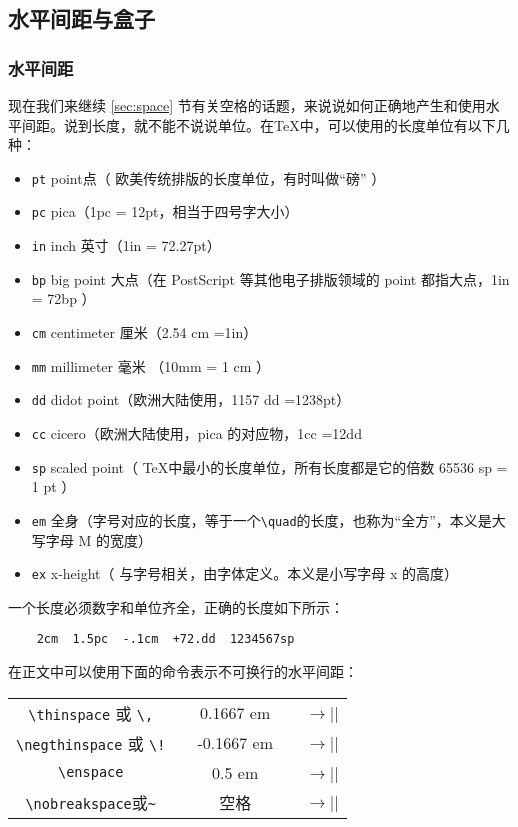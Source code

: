 \subsection{水平间距与盒子} \label{sec:box}

\subsubsection{水平间距}

现在我们来继续 \ref{sec:space} 节有关空格的话题，来说说如何正确地产生和使用水平间距。说到长度，就不能不说说单位。在\TeX 中，可以使用的长度单位有以下几种：
\begin{itemize}
    \item \verb|pt| \qquad point点（ 欧美传统排版的长度单位，有时叫做“磅” ）
    \item \verb|pc| \qquad pica（1pc = 12pt，相当于四号字大小）
    \item \verb|in| \qquad inch 英寸（1in = 72.27pt）
    \item \verb|bp| \qquad big point 大点（在 PostScript 等其他电子排版领域的 point 都指大点，1in = 72bp ）
    \item \verb|cm| \qquad centimeter 厘米（2.54 cm =1in）
    \item \verb|mm| \qquad millimeter 毫米 （10mm = 1 cm ）
    \item \verb|dd| \qquad didot point（欧洲大陆使用，1157 dd =1238pt）
    \item \verb|cc| \qquad cicero（欧洲大陆使用，pica 的对应物，1cc =12dd
    \item \verb|sp| \qquad scaled point（ \TeX 中最小的长度单位，所有长度都是它的倍数 65536 sp = 1 pt ）
    \item \verb|em| \qquad 全身（字号对应的长度，等于一个\verb|\quad|的长度，也称为“全方”，本义是大写字母 M 的宽度）
    \item \verb|ex| \qquad x-height（ 与字号相关，由字体定义。本义是小写字母 x 的高度）
\end{itemize}

一个长度必须数字和单位齐全，正确的长度如下所示：
\begin{lstlisting}
    2cm  1.5pc  -.1cm  +72.dd  1234567sp
\end{lstlisting}

在正文中可以使用下面的命令表示不可换行的水平间距：
\begin{table}[H]
    \centering
    \begin{tabular}{ccccc}
    \verb|\thinspace| 或 \verb|\,| && 0.1667 em && $\longrightarrow$\negthinspace|\thinspace| \\
    \verb|\negthinspace| 或 \verb|\!| && -0.1667 em && $\longrightarrow$\negthinspace|\negthinspace\negthinspace| \\
    \verb|\enspace|  && 0.5 em && $\longrightarrow$\negthinspace|\enspace| \\
    \verb|\nobreakspace|或\verb|~|  &&  空格 && $\longrightarrow$\negthinspace|\nobreakspace| \\
    \end{tabular}
\end{table}

